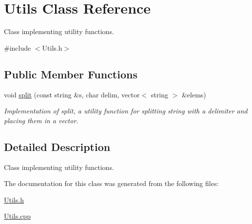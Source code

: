 \hypertarget{classUtils}{}\section{Utils Class Reference}
\label{classUtils}


Class implementing utility functions.  




{\ttfamily \#include $<$Utils.\+h$>$}

\subsection*{Public Member Functions}
\begin{DoxyCompactItemize}
\item 
\hypertarget{classUtils_a87a204cc82c4e1135e17b1fe19f061ff}{}\label{classUtils_a87a204cc82c4e1135e17b1fe19f061ff} 
void \hyperlink{classUtils_a87a204cc82c4e1135e17b1fe19f061ff}{split} (const string \&s, char delim, vector$<$ string $>$ \&elems)
\begin{DoxyCompactList}\small\item\em Implementation of split, a utility function for splitting string with a delimiter and placing them in a vector. \end{DoxyCompactList}\end{DoxyCompactItemize}


\subsection{Detailed Description}
Class implementing utility functions. 

The documentation for this class was generated from the following files\+:\begin{DoxyCompactItemize}
\item 
\hyperlink{Utils_8h}{Utils.\+h}\item 
\hyperlink{Utils_8cpp}{Utils.\+cpp}\end{DoxyCompactItemize}
